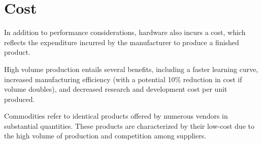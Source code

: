 \section{Cost}

In addition to performance considerations, hardware also incurs a cost, which reflects the expenditure incurred by the manufacturer to produce a finished product.

High volume production entails several benefits, including a faster learning curve, increased manufacturing efficiency (with a potential 10\% reduction in cost if volume doubles), and decreased research and development cost per unit produced.

Commodities refer to identical products offered by numerous vendors in substantial quantities. 
These products are characterized by their low-cost due to the high volume of production and competition among suppliers.
